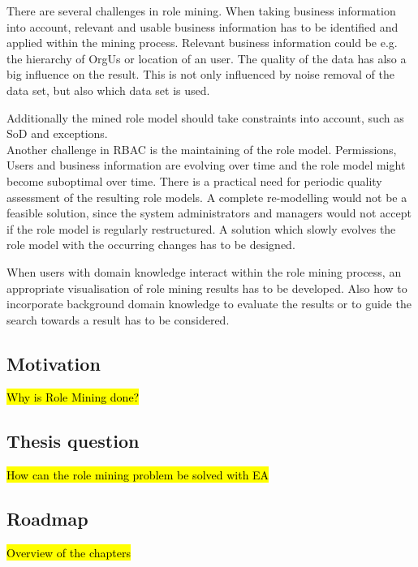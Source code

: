 There are several challenges in role mining. When taking business information into account, relevant and usable business information has to be identified and applied within the mining process. Relevant business information could be e.g. the hierarchy of \glspl{OrgU} or location of an user. The quality of the data has also a big influence on the result. This is not only influenced by noise removal of the data set, but also which data set is used.
\iffalse
In order to meet the least privileged access principle, a data set, which describes the actual user activity and usage of permissions is preferable. These information can come from system logs, which truly records the permission-usage and permission-update information. \cite{Molloy}\\
\fi

Additionally the mined role model should take constraints into account, such as \gls{SoD} and exceptions. \cite{Lu}\\

Another challenge in \gls{RBAC} is the maintaining of the role model. Permissions, Users and business information are evolving over time and the role model might become suboptimal over time. There is a practical need for periodic quality assessment of the resulting role models. \cite{Kunz} A complete re-modelling would not be a feasible solution, since the system administrators and managers would not accept if the role model is regularly restructured. A solution which slowly evolves the role model with the occurring changes has to be designed.


When users with domain knowledge interact within the role mining process, an appropriate visualisation of role mining results has to be developed. Also how to incorporate background domain knowledge to evaluate the results or to guide the search towards a result has to be considered. \cite{Han}\\

\iffalse
Currently researchers are looking into using artificial intelligence (AI) techniques to design role mining algorithms. \cite{DuChang}
\fi

\fi

\subsection{Motivation}
\hl{Why is Role Mining done?}
\subsection{Thesis question}
\hl{How can the role mining problem be solved with EA}
\subsection{Roadmap}
\hl{Overview of the chapters}